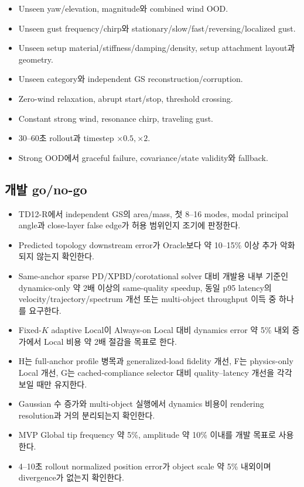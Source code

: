 \documentclass[10pt,a4paper]{article}
\newcommand{\todo}{\textcolor{TodoGray}{\(\square\)}}
\begin{document}
\begin{itemize}
  \item[\todo] Unseen yaw/elevation, magnitude와 combined wind OOD.
  \item[\todo] Unseen gust frequency/chirp와 stationary/slow/fast/reversing/localized gust.
  \item[\todo] Unseen setup material/stiffness/damping/density, setup attachment layout과 geometry.
  \item[\todo] Unseen category와 independent GS reconstruction/corruption.
  \item[\todo] Zero-wind relaxation, abrupt start/stop, threshold crossing.
  \item[\todo] Constant strong wind, resonance chirp, traveling gust.
  \item[\todo] 30--60초 rollout과 timestep \(\times0.5,\times2\).
  \item[\todo] Strong OOD에서 graceful failure, covariance/state validity와 fallback.
\end{itemize}

\subsection*{개발 go/no-go}

\begin{itemize}
  \item[\todo] TD12-R에서 independent GS의 area/mass, 첫 8--16 modes, modal principal angle과 close-layer false edge가 허용 범위인지 조기에 판정한다.
  \item[\todo] Predicted topology downstream error가 Oracle보다 약 10--15\% 이상 추가 악화되지 않는지 확인한다.
  \item[\todo] Same-anchor sparse PD/XPBD/corotational solver 대비
  개발용 내부 기준인 dynamics-only 약 2배 이상의 same-quality speedup,
  동일 p95 latency의 velocity/trajectory/spectrum 개선 또는
  multi-object throughput 이득 중 하나를 요구한다.
  \item[\todo] Fixed-\(K\) adaptive Local이 Always-on Local 대비 dynamics error 약 5\% 내외 증가에서 Local 비용 약 2배 절감을 목표로 한다.
  \item[\todo] H는 full-anchor profile 병목과 generalized-load fidelity 개선, F는 physics-only Local 개선, G는 cached-compliance selector 대비 quality--latency 개선을 각각 보일 때만 유지한다.
  \item[\todo] Gaussian 수 증가와 multi-object 실행에서 dynamics 비용이 rendering resolution과 거의 분리되는지 확인한다.
  \item[\todo] MVP Global tip frequency 약 5\%, amplitude 약 10\% 이내를 개발 목표로 사용한다.
  \item[\todo] 4--10초 rollout normalized position error가 object scale 약 5\% 내외이며 divergence가 없는지 확인한다.
\end{itemize}
\end{document}
